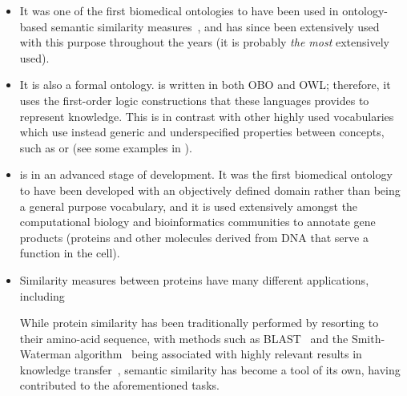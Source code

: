 \begin{itemize}
    \item It was one of the first biomedical ontologies to have been used in ontology-based semantic similarity measures~\citep{Lord2003}, and has since been extensively used with this purpose throughout the years (it is probably \emph{the most} extensively used).
    
    \item It is also a formal ontology.  is written in both OBO and OWL; therefore, it uses the first-order logic constructions that these languages provides to represent knowledge. This is in contrast with other highly used vocabularies which use instead generic and underspecified properties between concepts, such as  or  (see some examples in ).
    
    \item {} is in an advanced stage of development. It was the first biomedical ontology to have been developed with an objectively defined domain rather than being a general purpose vocabulary, and it is used extensively amongst the computational biology and bioinformatics communities to annotate gene products (proteins and other molecules derived from DNA that serve a function in the cell).
    
    \item Similarity measures between proteins have many different applications, including
    While protein similarity has been traditionally performed by resorting to their amino-acid sequence, with methods such as BLAST~\citep{Altschul1997} and the Smith-Waterman algorithm~\citep{Smith1981} being associated with highly relevant results in knowledge transfer~\citep{Wyman2004}, semantic similarity has become a tool of its own, having contributed to the aforementioned tasks.
\end{itemize}


